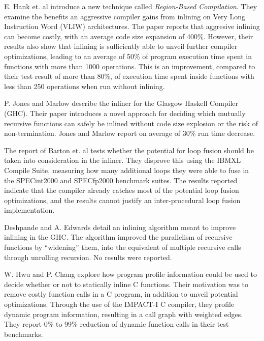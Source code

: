 E. Hank et. al \cite{RegionBasedCompilationIntroduction} introduce a new
technique called \textit{Region-Based Compilation}. They examine the benefits an
aggressive compiler gains from inlining on Very Long Instruction Word (VLIW)
architectures. The paper reports that aggresive inlining can become costly, with
an average code size expansion of 400\%. However, their results also show that
inlining is sufficiently able to unveil further compiler optimizations, leading
to an average of 50\% of program execution time spent in functions with more
than 1000 operations. This is an improvement, compared to their test result of
more than 80\%, of execution time spent inside functions with less than 250
operations when run without inlining.

P. Jones and Marlow \cite{GHCPaper} describe the inliner for the Glasgow Haskell
Compiler (GHC). Their paper introduces a novel approach for deciding which
mutually recursive functions can safely be inlined without code size explosion
or the risk of non-termination. Jones and Marlow report on average of 30\% run
time decrease.

The report of Barton et. al \cite{ShouldLoopOptsInfluenceInlining} tests whether
the potential for loop fusion should be taken into consideration in the inliner.
They disprove this using the IBM\textregistered XL Compile Suite, measuring how
many additional loops they were able to fuse in the SPECint2000 and SPECfp2000
benchmark suites. The results reported indicate that the compiler already
catches most of the potential loop fusion optimizations, and the results cannot
justify an inter-procedural loop fusion implementation.

Deshpande and A. Edwards \cite{deshpande2012statically} detail an inlining
algorithm meant to improve inlining in the GHC. The algorithm improved the
parallelism of recursive functions by ``widening'' them, into the equivalent of
multiple recursive calls through unrolling recursion. No results were reported.

W. Hwu and P. Chang \cite{InlineFuncExpCProgs} explore how program profile
information could be used to decide whether or not to statically inline C
functions. Their motivation was to remove costly function calls in a C program,
in addition to unveil potential optimizations. Through the use of the IMPACT-I C
compiler, they profile dynamic program information, resulting in a call graph
with weighted edges. They report 0\% to 99\% reduction of dynamic function calls
in their test benchmarks.
